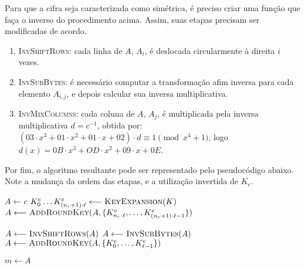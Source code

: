 \documentclass{article}
\begin{document}
Para que a cifra seja caracterizada como simétrica, é preciso criar uma função que faça o inverso do procedimento acima. Assim, suas etapas precisam ser modificadas de acordo.

\begin{enumerate}[label=\roman*.]

    \item \textsc{InvShiftRows}: cada linha de $A$, $A_i$, é deslocada circularmente à direita $i$ vezes.

    \item \textsc{InvSubBytes}: é necessário computar a transformação afim inversa para cada elemento $A_{i,j}$, e depois calcular sua inversa multiplicativa.
    
    \item \textsc{InvMixColumns}: cada coluna de $A$, $A_j$, é multiplicada pela inversa multiplicativa $d = c^{-1}$, obtida por: $(03 \cdot x^{3} + 01 \cdot x^{2} + 01 \cdot x + 02) \cdot d \equiv 1 \pmod{x^{4} + 1}$, logo $d(x) = 0B \cdot x^{3} + OD \cdot x^{2} + 09 \cdot x + 0E$.

\end{enumerate}

Por fim, o algoritmo resultante pode ser representado pelo pseudocódigo abaixo. Note a mudança da ordem das etapas, e a utilização invertida de $K_e$.

\begin{algorithm}[H]

    $A \longleftarrow c$\;
    $K^{e}_{0} \dots K^{e}_{(n_r + 1) \cdot \ell}
        \longleftarrow \textsc{KeyExpansion}(K)$\;
    $A \longleftarrow \textsc{AddRoundKey}(A,
        \{K^{e}_{n_r \cdot \ell}, \dots, K^{e}_{(n_r + 1) \cdot \ell - 1}\})$\;
    
 
    $A \longleftarrow \textsc{InvShiftRows}(A)$\;
    $A \longleftarrow \textsc{InvSubBytes}(A)$\;
    $A \longleftarrow \textsc{AddRoundKey}(A,
        \{K^{e}_{0}, \dots, K^{e}_{\ell - 1}\})$\;

    $m \longleftarrow A$\;
\end{algorithm}
\end{document}
